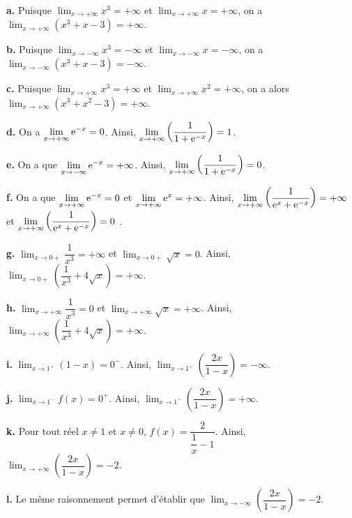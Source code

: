 \documentclass[11pt,fleqn, openany]{book} %
\begin{document}
\begin{solution}
\textbf{a.} Puisque $\displaystyle \lim_{x \to +\infty}x^3=+\infty$ et $\displaystyle \lim_{x \to +\infty} x = +\infty$, on a $\displaystyle \lim_{x \to +\infty} (x^3+x-3)=+\infty$.

\textbf{b.} Puisque $\displaystyle \lim_{x \to -\infty}x^3=-\infty$ et $\displaystyle \lim_{x \to -\infty} x = -\infty$, on a $\displaystyle \lim_{x \to -\infty} (x^3+x-3)=-\infty$.

\textbf{c.} Puisque $\displaystyle \lim_{x \to +\infty}x^3=+\infty$ et $\displaystyle \lim_{x \to +\infty} x^2 = +\infty$, on a alors $\displaystyle \lim_{x \to +\infty} (x^3+x^2-3)=+\infty$.

\textbf{d.} On a $\displaystyle \lim_{x \to +\infty} \mathrm{e}^{-x}=0$. Ainsi, $\displaystyle \lim_{x \to +\infty} \left(\dfrac{1}{1+\mathrm{e}^{-x}}\right)=1$.

\textbf{e.} On a que $\displaystyle \lim_{x \to -\infty} \mathrm{e}^{-x}=+\infty$. Ainsi, $\displaystyle \lim_{x \to +\infty} \left(\dfrac{1}{1+\mathrm{e}^{-x}}\right)=0$.

\textbf{f.} On a que $\displaystyle \lim_{x \to +\infty} \mathrm{e}^{-x}=0$ et $\displaystyle \lim_{x \to +\infty} \mathrm{e}^{x}=+\infty$. Ainsi, $\displaystyle \lim_{x \to +\infty} \left(\dfrac{1}{\mathrm{e}^x+\mathrm{e}^{-x}}\right)=+\infty$ et $\displaystyle \lim_{x \to +\infty}\left(\dfrac{1}{\mathrm{e}^x+\mathrm{e}^{-x}}\right)=0$ .

\textbf{g.} $\displaystyle \lim_{x \to 0+} \dfrac{1}{x^3}=+\infty$ et $\displaystyle \lim_{x \to 0+}\sqrt{x}=0$. Ainsi, $\displaystyle \lim_{x \to 0+} \left(\dfrac{1}{x^3}+4\sqrt{x}\right)=+\infty$.

\textbf{h.} $\displaystyle \lim_{x \to +\infty} \dfrac{1}{x^3}=0$ et $\displaystyle \lim_{x \to +\infty} \sqrt{x}=+\infty$. Ainsi, $\displaystyle \lim_{x \to +\infty} \left(\dfrac{1}{x^3}+4\sqrt{x}\right)=+\infty$.

\textbf{i.} $\displaystyle \lim_{x \to 1^+} (1-x)=0^-$. Ainsi, $\displaystyle \lim_{x \to 1^+}\left( \dfrac{2x}{1-x}\right)= -\infty$.

\textbf{j.} $\displaystyle \lim_{x \to 1^-} f(x)=0^+$. Ainsi, $\displaystyle \lim_{x \to 1^-}\left( \dfrac{2x}{1-x}\right)=+\infty$.

\textbf{k.} Pour tout réel $x\neq 1$ et $x\neq 0$, $f(x)=\dfrac{2}{\dfrac{1}{x}-1}$. Ainsi, $\displaystyle \lim_{x \to +\infty}\left( \dfrac{2x}{1-x}\right)=-2$.

\textbf{l.} Le même raisonnement permet d'établir que $\displaystyle \lim_{x \to -\infty}\left( \dfrac{2x}{1-x}\right)=-2$.


\end{solution}
\end{document}
